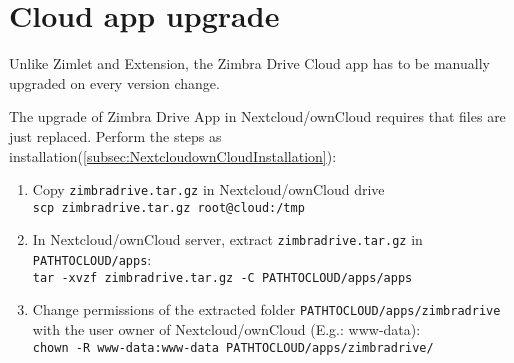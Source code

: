 \section{Cloud app upgrade}
Unlike Zimlet and Extension, the Zimbra Drive Cloud app has to be manually upgraded on every version change.

The upgrade of Zimbra Drive App in Nextcloud/ownCloud requires that files are just replaced.
Perform the steps as installation(\ref{subsec:NextcloudownCloudInstallation}):
    \begin{enumerate}
        \item Copy \texttt{zimbradrive.tar.gz} in Nextcloud/ownCloud drive\\ 
        \texttt{scp zimbradrive.tar.gz root@cloud:/tmp}

        \item In Nextcloud/ownCloud server, extract \texttt{zimbradrive.tar.gz}  in \texttt{PATH\textunderscore TO\textunderscore CLOUD/apps}:\\
        \texttt{tar -xvzf zimbradrive.tar.gz -C \texttt{PATH\textunderscore TO\textunderscore CLOUD/apps}/apps}

        \item Change permissions of the extracted folder \texttt{PATH\textunderscore TO\textunderscore CLOUD/apps/zimbradrive}
        with the user owner of Nextcloud/ownCloud (E.g.: www-data):\\
        \texttt{chown -R www-data:www-data PATH\textunderscore TO\textunderscore CLOUD/apps/zimbradrive/}
    \end{enumerate}

